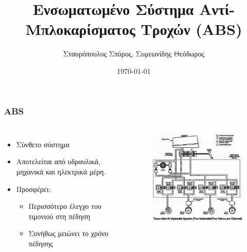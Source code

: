 \documentclass[fleqn]{beamer}
\title{Ενσωματωμένο Σύστημα Αντί-Mπλοκαρίσματος Τροχών (ABS)}
\author{Σταυρόπουλος Σπύρος, Συμεωνίδης Θεόδωρος}
\institute{Τμήμα Μηχανικών Η/Υ & Πληροφορικής, Πανεπιστήμιο Πατρών}
\date{\today}
\begin{document}
\begin{frame}
  \titlepage
\end{frame}

\begin{frame}
  \frametitle{ABS}
  \begin{columns}[T]
  
    
   \begin{itemize}
    \item Σύνθετο σύστημα
    \item Αποτελείται από υδραυλικά, μηχανικά και ηλεκτρικά μέρη.
    \item  Προσφέρει:
        \begin{itemize}
            \item Περισσότερο έλεγχο του τιμονιού στη πέδηση
            \item Συνήθως μειώνει το χρόνο πέδησης
        \end{itemize}
    \end{itemize}

    
    \begin{figure}[H]
    \begin{center}
    \includegraphics[scale=0.60]{images/hydraulic-mechanical-system-overview.jpg}
    \end{center}
    \end{figure}
    
  \end{columns}
\end{frame}
\end{document}
